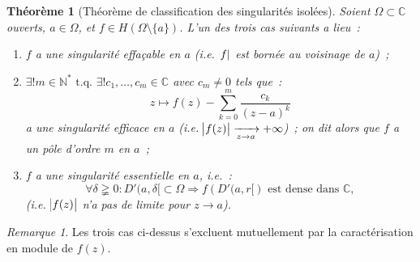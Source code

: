 \documentclass{report}
\newtheorem{thm}{Théorème}[chapter]
\theoremstyle{definition}
\theoremstyle{remark}
\newtheorem*{rmq}{Remarque}
\numberwithin{equation}{section}
\newcommand{\C}{\mathbb C}
\newcommand{\N}{\mathbb N}
\newcommand{\tq}{\text{ t.q. }}
\newcommand{\pinfty}{{+\infty}}
\begin{document}
			\begin{thm}[Théorème de classification des singularités isolées] Soient $\Omega \subset \C$ ouverts, $a \in \Omega$, et $f \in H(\Omega \setminus \{a\})$.
			L'un des trois cas suivants a lieu~:
			\begin{enumerate}
				\item $f$ a une singularité effaçable en $a$ (i.e. $\abs f$ est bornée au voisinage de $a$)~;
				\item $\exists! m \in \N^* \tq \exists! c_1, \ldots, c_m \in \C$ avec $c_m \neq 0$ tels que~:
				\begin{equation}
					z \mapsto f(z) - \sum_{k=0}^m\frac {c_k}{(z-a)^k}
				\end{equation}
				a une singularité efficace en $a$ (i.e. $\abs {f(z)} \xrightarrow[z \to a]{} \pinfty$)~; on dit alors que \textit{$f$ a un pôle d'ordre $m$ en $a$}~;
				\item $f$ a une \textit{singularité essentielle} en $a$, i.e.~:
				\begin{equation}
					\forall \delta \gneqq 0 : D'(a, \delta[ \subset \Omega \Rightarrow f\left(D'(a, r[\right) \text{ est dense dans } \C,
				\end{equation}
				(i.e. $\abs {f(z)}$ n'a pas de limite pour $z \to a$).
			\end{enumerate}
			\end{thm}

			\begin{rmq} Les trois cas ci-dessus s'excluent mutuellement par la caractérisation en module de $f(z)$.
			\end{rmq}
\end{document}
